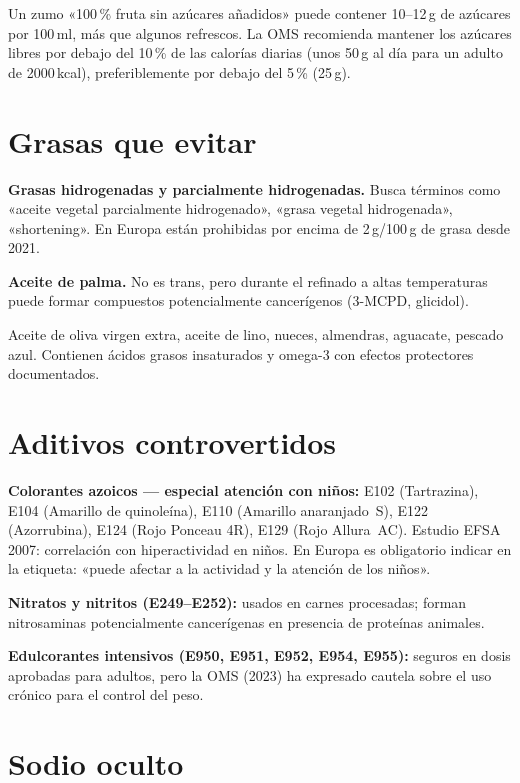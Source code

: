\documentclass[a5paper,12pt,oneside,openany]{book}
\newcommand{\boxverde}[2]{%
  \begin{tcolorbox}[cajabase,
    colback=verdescuro!8!white, colframe=verdescuro, title={#1}]
  #2\end{tcolorbox}}
\newcommand{\boxamarillo}[2]{%
  \begin{tcolorbox}[cajabase,
    colback=amarillo!12!white, colframe=amarillo!80!black, title={#1}]
  #2\end{tcolorbox}}
\begin{document}
\boxamarillo{La trampa del «sin azúcares añadidos»}{Un zumo «100\,\% fruta sin
azúcares añadidos» puede contener 10--12\,g de azúcares por 100\,ml, más que
algunos refrescos. La OMS recomienda mantener los azúcares libres por debajo del
10\,\% de las calorías diarias (unos 50\,g al día para un adulto de 2000\,kcal),
preferiblemente por debajo del 5\,\% (25\,g).}

\section{Grasas que evitar}

\textbf{Grasas hidrogenadas y parcialmente hidrogenadas.} Busca términos como
«aceite vegetal parcialmente hidrogenado», «grasa vegetal hidrogenada»,
«shortening». En Europa están prohibidas por encima de 2\,g/100\,g de grasa
desde 2021.

\textbf{Aceite de palma.} No es trans, pero durante el refinado a altas
temperaturas puede formar compuestos potencialmente cancerígenos (3-MCPD,
glicidol).

\boxverde{Grasas recomendadas}{Aceite de oliva virgen extra, aceite de lino,
nueces, almendras, aguacate, pescado azul. Contienen ácidos grasos
insaturados y omega-3 con efectos protectores documentados.}

\section{Aditivos controvertidos}

\textbf{Colorantes azoicos --- especial atención con niños:}
E102 (Tartrazina), E104 (Amarillo de quinoleína), E110 (Amarillo anaranjado~S),
E122 (Azorrubina), E124 (Rojo Ponceau 4R), E129 (Rojo Allura~AC).
Estudio EFSA 2007: correlación con hiperactividad en niños. En Europa es
obligatorio indicar en la etiqueta: «puede afectar a la actividad y la
atención de los niños».

\textbf{Nitratos y nitritos (E249--E252):} usados en carnes procesadas;
forman nitrosaminas potencialmente cancerígenas en presencia de proteínas
animales.

\textbf{Edulcorantes intensivos (E950, E951, E952, E954, E955):} seguros en
dosis aprobadas para adultos, pero la OMS (2023) ha expresado cautela sobre
el uso crónico para el control del peso.

\section{Sodio oculto}
\end{document}
